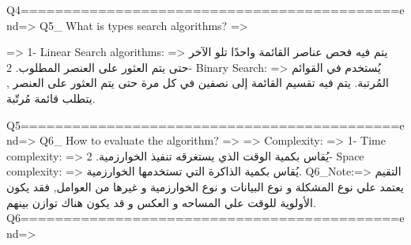                             Q4============================================end=>
Q5_ What is types search algorithms? =>{
     
    \types\: => {
        1- Linear Search algorithms: => يتم فيه فحص عناصر القائمة واحدًا تلو الآخر حتى يتم العثور على العنصر المطلوب. 
        2- Binary Search: => يُستخدم في القوائم المُرتبة. يتم فيه تقسيم القائمة إلى نصفين في كل مرة حتى يتم العثور على العنصر , يتطلب قائمة مُرتّبة.
    }
}                            
                            Q5============================================end=>
Q6_ How to evaluate the algorithm? =>{
    \evaluation\: => {
        Complexity: =>{
            1- Time complexity: => يُقاس بكمية الوقت الذي يستغرقه تنفيذ الخوارزمية.
            2- Space complexity: => يُقاس بكمية الذاكرة التي تستخدمها الخوارزمية.
        }
        Q6_Note:=> التقيم يعتمد علي نوع المشكلة و نوع البيانات و نوع الخوارزمية و غيرها من العوامل, فقد يكون الأولوية للوقت علي المساحه و العكس و قد يكون هناك توازن بينهم.
    }
}                           
                            Q6============================================end=>
